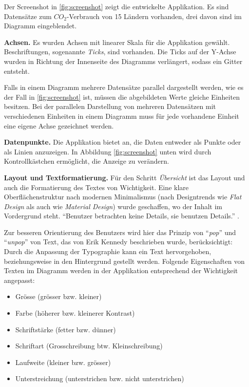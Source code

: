 Der Screenshot in \ref{fig:screenshot} zeigt die entwickelte Applikation. Es sind Datensätze \cite{worldbank} zum $CO_2$-Verbrauch von 15 Ländern vorhanden, drei davon sind im Diagramm eingeblendet.

\textbf{Achsen.} Es wurden Achsen mit linearer Skala für die Applikation gewählt. Beschriftungen, sogenannte \textit{Ticks}, sind vorhanden. Die Ticks auf der Y-Achse wurden in Richtung der Innenseite des Diagramms verlängert, sodass ein Gitter entsteht.

Falls in einem Diagramm mehrere Datensätze parallel dargestellt werden, wie es der Fall in \ref{fig:screenshot} ist, müssen die abgebildeten Werte gleiche Einheiten besitzen. Bei der parallelen Darstellung von mehreren Datensätzen mit verschiedenen Einheiten in einem Diagramm muss für jede vorhandene Einheit eine eigene Achse gezeichnet werden.

\textbf{Datenpunkte.} Die Applikation bietet an, die Daten entweder als Punkte oder als Linien anzuzeigen. In Abbildung \ref{fig:screenshot} unten wird durch Kontrollkästchen ermöglicht, die Anzeige zu verändern.

\textbf{Layout und Textformatierung.} Für den Schritt \textit{Übersicht} ist das Layout und auch die Formatierung des Textes von Wichtigkeit. Eine klare Oberflächenstruktur nach modernen Minimalismus (nach Designtrends wie \textit{Flat Design} als auch wie \textit{Material Design}) wurde geschaffen, wo der Inhalt im Vordergrund steht. "`Benutzer betrachten keine Details, sie benutzen Details."' \cite{minimalism}.

Zur besseren Orientierung des Benutzers wird hier das Prinzip von "`\textit{pop}"' und "`\textit{unpop}"' von Text, das von Erik Kennedy \cite{pop} beschrieben wurde, berücksichtigt: Durch die Anpassung der Typographie kann ein Text hervorgehoben, beziehungsweise in den Hintergrund gestellt werden. Folgende Eigenschaften von Texten im Diagramm werden in der Applikation entsprechend der Wichtigkeit angepasst:

\begin{itemize}
	\item Grösse (grösser bzw. kleiner)
	\item Farbe (höherer bzw. kleinerer Kontrast)
	\item Schriftstärke (fetter bzw. dünner)
	\item Schriftart (Grosschreibung btw. Kleinschreibung)
	\item Laufweite (kleiner bzw. grösser)
	\item Unterstreichung (unterstrichen bzw. nicht unterstrichen)
\end{itemize}

